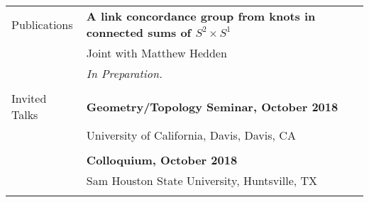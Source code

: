 \documentclass[letterpaper,11pt,oneside]{article}
\begin{document}
\begin{tabular}{@{} l l}
 \Large{Publications}    & \textbf{A link concordance group from knots in connected sums of $S^2 \times S^1$} \\
     & Joint with Matthew Hedden \\
     & \sl{In Preparation.}  \\
     & \\
     
       \Large{Invited Talks} & \textbf{Geometry/Topology Seminar, October 2018} \\
     & University of California, Davis, Davis, CA\\
     & \\
        & \textbf{Colloquium, October 2018 } \\
     & Sam Houston State University, Huntsville, TX\\
     & \\       \end{tabular}
\end{document}
